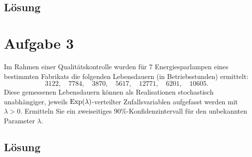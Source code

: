 \documentclass{exercise}
\begin{document}
    \subsection*{Lösung}


    \section*{Aufgabe 3}
    
    \begin{problem}
        Im Rahmen einer Qualitätskontrolle wurden für \(7\) Energiesparlampen eines bestimmten Fabrikats die folgenden Lebensdauern (in Betriebsstunden) ermittelt:
        \[
            3122, \quad 7784, \quad 3870, \quad 5617, \quad 12771, \quad 6201, \quad 10605.
        \]
        Diese gemessenen Lebensdauern können als Realisationen stochastisch unabhängiger, jeweils \(\Exp\parentheses*{\lambda}\)-verteilter Zufallsvariablen aufgefasst werden mit \(\lambda > 0\).
        Ermitteln Sie ein zweiseitiges \(90\%\)-Konfidenzintervall für den unbekannten Parameter \(\lambda\).
    \end{problem}
    
    \subsection*{Lösung}
\end{document}
